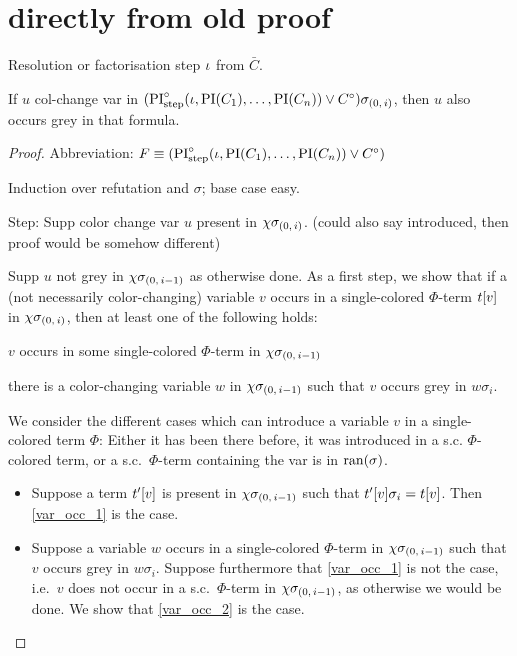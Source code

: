 \documentclass[,%
	draft=false,%
	numbers=noendperiod
	12pt,
	a4paper,
	oneside,%
	openany,
]{memoir}
\newcommand{\inv}{\ensuremath{\chi}}
\begin{document}
\section{directly from old proof}


\begin{lemma}
	\label{lemma:col_change}
	Resolution or factorisation step $\iota$ from $\bar C$.

	If $u$ col-change var in $(\operatorname{PI}^\circ_{\mathrm{step}}(\iota, \operatorname{PI}(C_1), \dots, \operatorname{PI}(C_n)) \lor C^\circ)\sigma_{(0,\,i)}$, then $u$ also occurs grey in that formula.
\end{lemma}
\begin{proof}
	Abbreviation: $F \equiv (\operatorname{PI}^\circ_{\mathrm{step}}(\iota, \operatorname{PI}(C_1), \dots, \operatorname{PI}(C_n)) \lor C^\circ)$

	Induction over refutation and $\sigma$; base case easy.

	Step:
	Supp color change var $u$ present in 
	$\inv\sigmazi$. (could also say introduced, then proof would be somehow different)

	Supp $u$ not grey in 
	$\inv\sigmazmi$ as otherwise done.
	As a first step, we show that if a (not necessarily color-changing) variable $v$ occurs in a single-colored $\Phi$-term $t[v]$ in $\inv\sigmazi$,
	then at least one of the following holds:
	\begin{compactenum}
	\item $v$ occurs in some single-colored $\Phi$-term in $\inv\sigmazmi$ \label{var_occ_1}
	\item there is a color-changing variable $w$ in $\inv\sigmazmi$ such that $v$ occurs grey in $w\sigma_i$.  \label{var_occ_2}
	\end{compactenum}
	We consider the different cases which can introduce a variable $v$ in a single-colored term $\Phi$: Either it has been there before, it was introduced in a s.c. $\Phi$-colored term, or a s.c.\ $\Phi$-term containing the var is in $\operatorname{ran}(\sigma)$.
	\begin{itemize}
		\item
			Suppose a term $t'[v]$ is present in $\inv\sigmazmi$ such that $t'[v]\sigma_i = t[v]$.
			Then \ref{var_occ_1} is the case.
		\item
			Suppose a variable $w$ occurs in a single-colored $\Phi$-term in $\inv\sigmazmi$ such that $v$ occurs grey in $w\sigma_i$.
			Suppose furthermore that \ref{var_occ_1} is not the case, i.e.\ $v$ does not occur in a s.c.\ $\Phi$-term in $\inv\sigmazmi$, as otherwise we would be done.
			We show that \ref{var_occ_2} is the case.


\end{itemize}
\end{proof}
\end{document}
